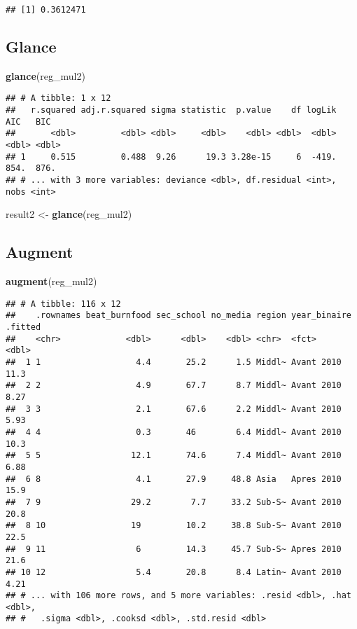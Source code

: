\documentclass[
]{article}
\newenvironment{Shaded}{\begin{snugshade}}{\end{snugshade}}
\newcommand{\KeywordTok}[1]{\textcolor[rgb]{0.13,0.29,0.53}{\textbf{#1}}}
\newcommand{\NormalTok}[1]{#1}
\newcommand{\StringTok}[1]{\textcolor[rgb]{0.31,0.60,0.02}{#1}}
\begin{document}
\begin{verbatim}
## [1] 0.3612471
\end{verbatim}

\hypertarget{glance}{%
\subsection{Glance}\label{glance}}

\begin{Shaded}
\begin{Highlighting}[]
\KeywordTok{glance}\NormalTok{(reg_mul2)}
\end{Highlighting}
\end{Shaded}

\begin{verbatim}
## # A tibble: 1 x 12
##   r.squared adj.r.squared sigma statistic  p.value    df logLik   AIC   BIC
##       <dbl>         <dbl> <dbl>     <dbl>    <dbl> <dbl>  <dbl> <dbl> <dbl>
## 1     0.515         0.488  9.26      19.3 3.28e-15     6  -419.  854.  876.
## # ... with 3 more variables: deviance <dbl>, df.residual <int>, nobs <int>
\end{verbatim}

\begin{Shaded}
\begin{Highlighting}[]
\NormalTok{result2 <-}\StringTok{ }\KeywordTok{glance}\NormalTok{(reg_mul2)}
\end{Highlighting}
\end{Shaded}

\hypertarget{augment}{%
\subsection{Augment}\label{augment}}

\begin{Shaded}
\begin{Highlighting}[]
\KeywordTok{augment}\NormalTok{(reg_mul2)}
\end{Highlighting}
\end{Shaded}

\begin{verbatim}
## # A tibble: 116 x 12
##    .rownames beat_burnfood sec_school no_media region year_binaire .fitted
##    <chr>             <dbl>      <dbl>    <dbl> <chr>  <fct>          <dbl>
##  1 1                   4.4       25.2      1.5 Middl~ Avant 2010     11.3 
##  2 2                   4.9       67.7      8.7 Middl~ Avant 2010      8.27
##  3 3                   2.1       67.6      2.2 Middl~ Avant 2010      5.93
##  4 4                   0.3       46        6.4 Middl~ Avant 2010     10.3 
##  5 5                  12.1       74.6      7.4 Middl~ Avant 2010      6.88
##  6 8                   4.1       27.9     48.8 Asia   Apres 2010     15.9 
##  7 9                  29.2        7.7     33.2 Sub-S~ Avant 2010     20.8 
##  8 10                 19         10.2     38.8 Sub-S~ Avant 2010     22.5 
##  9 11                  6         14.3     45.7 Sub-S~ Apres 2010     21.6 
## 10 12                  5.4       20.8      8.4 Latin~ Avant 2010      4.21
## # ... with 106 more rows, and 5 more variables: .resid <dbl>, .hat <dbl>,
## #   .sigma <dbl>, .cooksd <dbl>, .std.resid <dbl>
\end{verbatim}
\end{document}
